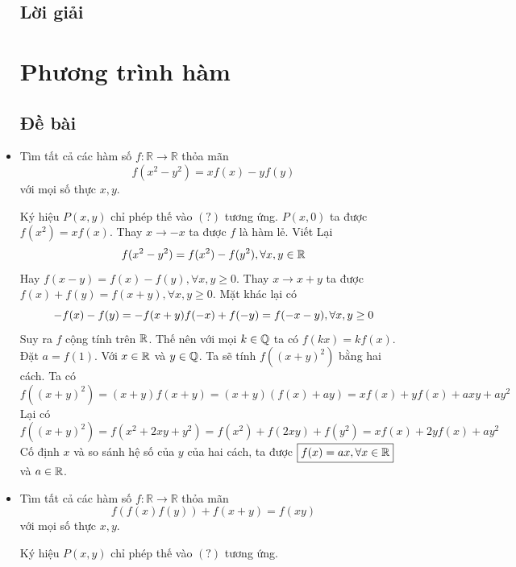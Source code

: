 \documentclass[11pt]{scrartcl}
\begin{document}
\begin{itemize}[label=, leftmargin=0em, itemsep=0.5em]
    \subsection{\LARGE \textcolor{dk}{Lời giải}}

    \newpage
    \thispagestyle{plain}
    
    \section{\huge Phương trình hàm}
    \subsection{\LARGE \textcolor{dk}{Đề bài}}
    
    \item \begin{bt}
        Tìm tất cả các hàm số $f: \mathbb{R} \to \mathbb{R}$ thỏa mãn
        \[
           f(x^2 - y^2) = xf(x) - yf(y)
        \]
        với mọi số thực $x,y$.
    \end{bt}
    \begin{sol}
        Ký hiệu $P(x,y)$ chỉ phép thế vào $(?)$ tương ứng. $P(x,0)$ ta được $f(x^2) = xf(x)$. Thay $x \to -x$ ta được $f$ là hàm lẻ. Viết Lại
        \[
            f(x^2 - y^2) = f(x^2) - f(y^2), \forall x,y \in \mathbb{R}
        \]
        Hay $f(x - y) = f(x) - f(y) ,\forall x, y \geq 0$. Thay $x \to x + y$ ta được $f(x) + f(y) = f(x + y), \forall x,y \geq 0$. Mặt khác lại có 
        \[
            -f(x) - f(y) = -f(x + y) \lra f(-x) + f(-y) = f(-x-y),\forall x,y \geq 0
        \]
        Suy ra $f$ cộng tính trên $\mathbb{R}$. Thế nên với mọi $k \in \mathbb{Q}$ ta có $f(kx) = kf(x)$. Đặt $a = f(1)$. Với $x \in \mathbb{R}$ và $y \in \mathbb{Q}$. Ta sẽ tính $f((x + y)^2)$ bằng hai cách. Ta có 
        \[
        f((x + y)^2) = (x + y)f(x + y) = (x + y)(f(x) + ay) = xf(x) + yf(x) + axy + ay^2
        \]
        Lại có 
        \[
        f((x + y)^2) = f(x^2 + 2xy + y^2) = f(x^2) + f(2xy) + f(y^2) = xf(x) + 2yf(x) + ay^2
        \]
        Cố định $x$ và so sánh hệ số của $y$ của hai cách, ta được $\boxed{f(x) = ax, \forall x\in \mathbb{R}}$ và $a \in \mathbb{R}$.
    \end{sol}
    \item \begin{bt}
        Tìm tất cả các hàm số $f: \mathbb{R} \to \mathbb{R}$ thỏa mãn
        \[
           f(f(x)f(y)) + f(x + y) = f(xy)\tag{1}
        \]
        với mọi số thực $x,y$.
    \end{bt}
    \begin{sol}
        Ký hiệu $P(x,y)$ chỉ phép thế vào $(?)$ tương ứng. 
    

\end{sol}
\end{itemize}
\end{document}
